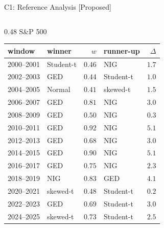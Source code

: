 \ifsolutions
\begin{frame}{C1: Reference Analysis [Proposed]}
\itemsize{\scriptsize}
\begin{columns}[T]
\begin{column}{0.48\textwidth}
\centering S\&P 500\begin{center}
\tiny
\begin{tabular}{llrlr}
\toprule
window & winner & $w$ & runner-up & $\Delta$ \\
\midrule
2000--2001 & Student-t & $0.46$ & NIG & $1.7$ \\
2002--2003 & GED & $0.44$ & Student-t & $1.0$ \\
2004--2005 & Normal & $0.41$ & skewed-t & $1.5$ \\
2006--2007 & GED & $0.81$ & NIG & $3.0$ \\
2008--2009 & GED & $0.50$ & NIG & $0.3$ \\
2010--2011 & GED & $0.92$ & NIG & $5.1$ \\
2012--2013 & GED & $0.68$ & NIG & $3.0$ \\
2014--2015 & GED & $0.90$ & NIG & $5.1$ \\
2016--2017 & GED & $0.75$ & NIG & $2.3$ \\
2018--2019 & NIG & $0.83$ & GED & $4.1$ \\
2020--2021 & skewed-t & $0.48$ & Student-t & $0.2$ \\
2022--2023 & GED & $0.69$ & Student-t & $3.0$ \\
2024--2025 & skewed-t & $0.73$ & Student-t & $2.5$ \\
\bottomrule
\end{tabular}
\end{center}


\end{column}
\end{columns}
\end{frame}
